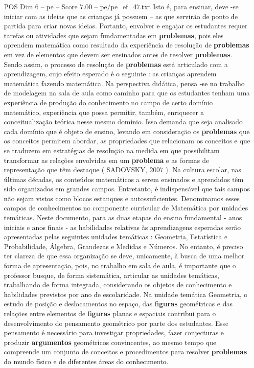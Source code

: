 \begin{textsample}{POS Dim 6 – pe – Score 7.00 – pe/pe\_ef\_47.txt}
Isto é, para ensinar, deve -se iniciar com as ideias que as crianças já possuem – as que servirão de ponto de partida para criar novas ideias.
Portanto, envolver e engajar os estudantes requer tarefas ou atividades que sejam fundamentadas em \textbf{problemas}, pois eles aprendem matemática como resultado da experiência de resolução de \textbf{problemas} em vez de elementos que devem ser ensinados antes de resolver \textbf{problemas}.
Sendo assim, o processo de resolução de \textbf{problemas} está articulado com a aprendizagem, cujo efeito esperado é o seguinte : as crianças aprendem matemática fazendo matemática.
Na perspectiva didática, pensa -se no trabalho de modelagem na sala de aula como caminho para que os estudantes tenham uma experiência de produção do conhecimento no campo de certo domínio matemático, experiência que possa permitir, também, enriquecer a conceitualização teórica nesse mesmo domínio.
Isso demanda que seja analisado cada domínio que é objeto de ensino, levando em consideração os \textbf{problemas} que os conceitos permitem abordar, as propriedades que relacionam os conceitos e que se traduzem em estratégias de resolução na medida em que possibilitam transformar as relações envolvidas em um \textbf{problema} e as formas de representação que têm destaque ( SADOVSKY, 2007 ).
Na cultura escolar, nas últimas décadas, os conteúdos matemáticos a serem ensinados e aprendidos têm sido organizados em grandes campos.
Entretanto, é indispensável que tais campos não sejam vistos como blocos estanques e autossuficientes.
Denominamos esses campos de conhecimentos no componente curricular de Matemática por unidades temáticas.
Neste documento, para as duas etapas do ensino fundamental - anos iniciais e anos finais - as habilidades relativas às aprendizagens esperadas serão apresentadas pelas seguintes unidades temáticas : Geometria, Estatística e Probabilidade, Álgebra, Grandezas e Medidas e Números.
No entanto, é preciso ter clareza de que essa organização se deve, unicamente, à busca de uma melhor forma de apresentação, pois, no trabalho em sala de aula, é importante que o professor busque, de forma sistemática, articular as unidades temáticas, trabalhando de forma integrada, considerando os objetos de conhecimento e habilidades previstos por ano de escolaridade.
Na unidade temática Geometria, o estudo de posição e deslocamentos no espaço, das \textbf{figuras} geométricas e das relações entre elementos de \textbf{figuras} planas e espaciais contribui para o desenvolvimento do pensamento geométrico por parte dos estudantes.
Esse pensamento é necessário para investigar propriedades, fazer conjecturas e produzir \textbf{argumentos} geométricos convincentes, ao mesmo tempo que compreende um conjunto de conceitos e procedimentos para resolver \textbf{problemas} do mundo físico e de diferentes áreas do conhecimento.

\end{textsample}
